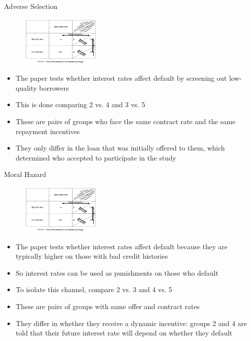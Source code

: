 \documentclass[11pt,notes=hide,aspectratio=169,mathserif]{beamer}
\begin{document}
\begin{frame}{Adverse Selection}
\begin{figure}
    \centering
    \includegraphics[width=0.35\textwidth]{inputs/main.png}
\end{figure}
\begin{itemize}
    \pause \item The paper tests whether interest rates affect default by screening out low-quality borrowers
    \pause \item This is done comparing 2 vs. 4 and 3 vs. 5
    \pause \item These are pairs of groups who face the same contract rate and the same repayment incentives
    \pause  \item They only differ in the loan that was initially offered to them, which determined who accepted to participate in the study
\end{itemize}
\end{frame}

\begin{frame}{Moral Hazard}
\begin{figure}
    \centering
    \includegraphics[width=0.35\textwidth]{inputs/main.png}
\end{figure}
\begin{itemize}
    \pause \item The paper tests whether interest rates affect default because they are typically higher on those with bad credit histories
    \pause \item So interest rates can be used as punishments on those who default
    \pause \item To isolate this channel, compare 2 vs. 3 and 4 vs. 5
    \pause \item These are pairs of groups with same offer and contract rates
    \pause \item They differ in whether they receive a dynamic incentive: groups 2 and 4 are told that their future interest rate will depend on whether they default
\end{itemize}
\end{frame}
\end{document}
